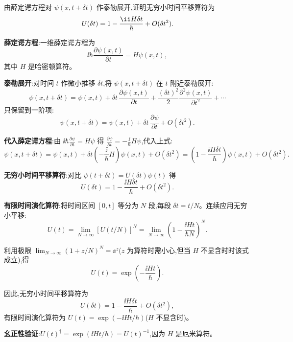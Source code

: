 \begin{question}
由薛定谔方程对 $\psi(x,t+\delta t)$ 作泰勒展开,证明无穷小时间平移算符为
\[
U(\delta t)=1-{\ii H\delta t\over\hbar}+O(\delta t^2).
\]
\begin{solution}
	\textbf{薛定谔方程}:一维薛定谔方程为
	\[
	\ii\hbar\frac{\partial\psi(x,t)}{\partial t} = H\psi(x,t),
	\]
	其中 $H$ 是哈密顿算符。

	\textbf{泰勒展开}:对时间 $t$ 作微小推移 $\delta t$,将 $\psi(x,t+\delta t)$ 在 $t$ 附近泰勒展开:
	\[
	\psi(x,t+\delta t) = \psi(x,t) + \delta t\,\frac{\partial\psi(x,t)}{\partial t} + \frac{(\delta t)^2}{2}\frac{\partial^2\psi(x,t)}{\partial t^2} + \cdots
	\]
	只保留到一阶项:
	\[
	\psi(x,t+\delta t) = \psi(x,t) + \delta t\,\frac{\partial\psi}{\partial t} + O(\delta t^2).
	\]

	\textbf{代入薛定谔方程}:由 $\ii\hbar\frac{\partial\psi}{\partial t}=H\psi$ 得 $\frac{\partial\psi}{\partial t} = -\frac{\ii}{\hbar}H\psi$,代入上式:
	\[
	\psi(x,t+\delta t) = \psi(x,t) + \delta t\left(-\frac{\ii}{\hbar}H\right)\psi(x,t) + O(\delta t^2)
	= \left(1 - \frac{\ii H\delta t}{\hbar}\right)\psi(x,t) + O(\delta t^2).
	\]

	\textbf{无穷小时间平移算符}:对比 $\psi(t+\delta t)=U(\delta t)\psi(t)$ 得
	\[
	U(\delta t) = 1 - \frac{\ii H\delta t}{\hbar} + O(\delta t^2).
	\]

	\textbf{有限时间演化算符}:将时间区间 $[0,t]$ 等分为 $N$ 段,每段 $\delta t = t/N$。连续应用无穷小平移:
	\[
	U(t) = \lim_{N\to\infty} [U(t/N)]^N
	= \lim_{N\to\infty} \left(1 - \frac{\ii H t}{\hbar N}\right)^N.
	\]

	利用极限 $\lim_{N\to\infty}(1+z/N)^N = \ee^z$($z$ 为算符时需小心,但当 $H$ 不显含时时该式成立),得
	\[
	U(t) = \exp\!\left(-\frac{\ii H t}{\hbar}\right).
	\]

	因此,无穷小时间平移算符为
	\[
	\boxed{U(\delta t) = 1 - \frac{\ii H\delta t}{\hbar} + O(\delta t^2)},
	\]
	有限时间演化算符为 $\boxed{U(t)=\exp(-\ii H t/\hbar)}$($H$ 不显含时)。

	\textbf{幺正性验证}:$U(t)^\dagger = \exp(\ii H t/\hbar) = U(t)^{-1}$,因为 $H$ 是厄米算符。
	\end{solution}
\end{question}

